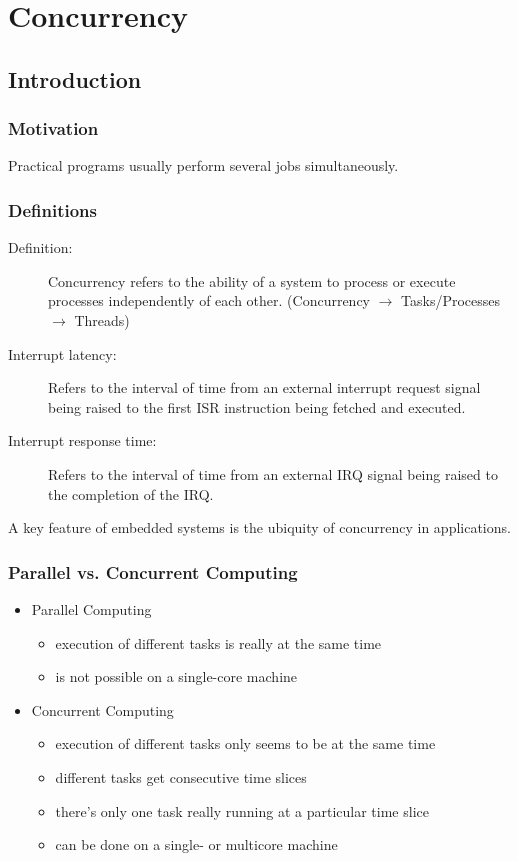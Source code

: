 \section{Concurrency}
\subsection{Introduction}
\subsubsection{Motivation}
Practical programs usually perform several jobs \glqq simultaneously\grqq.

\subsubsection{Definitions}
\begin{description}
	\item[Definition:] Concurrency refers to the ability of a system to process or execute processes independently of each other.
	      (Concurrency $\rightarrow$ Tasks/Processes $\rightarrow$ Threads)
	\item [Interrupt latency:] Refers to the interval of time from an external interrupt request signal being raised to the first ISR instruction being fetched and executed.
	\item [Interrupt response time:] Refers to the interval of time from an external IRQ signal being raised to the completion of the IRQ.
\end{description}
A key feature of embedded systems is the ubiquity of concurrency in applications.

\subsubsection{Parallel vs. Concurrent Computing}
\begin{itemize}
	\item Parallel Computing
	      \begin{itemize}
		      \item execution of different tasks is really at the same time
		      \item is not possible on a single-core machine
	      \end{itemize}
	\item Concurrent Computing
	      \begin{itemize}
		      \item execution of different tasks only seems to be at the same time
		      \item different tasks get consecutive time slices
		      \item there's only one task really running at a particular time slice
		      \item can be done on a single- or multicore machine
	      \end{itemize}
\end{itemize}

